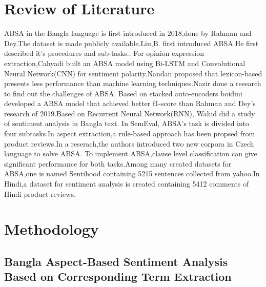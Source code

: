 \documentclass[a4paper,12pt]{article}
\begin{document}
\section{Review of Literature}
ABSA in the Bangla language is first introduced in 2018,done by Rahman and Dey\cite{rahman2018datasets}.The dataset is made publicly available.Liu,B. first introduced ABSA.He first described it's procedures and sub-tasks.\cite{liuABSA}.\newline
For opinion expression extraction,Cahyadi built an ABSA model using Bi-LSTM and Convolutional Neural Network(CNN) for sentiment polarity\cite{cahyadi2018aspect}.Nandan proposed that lexicon-based presents less performance than machine learning techniques\cite{nandal2019aspect}.Nazir done a research to find out the challenges of ABSA\cite{challenges}.\newline
Based on stacked auto-encoders boidini developed a ABSA model that achieved better f1-score than Rahman and Dey's research of 2019\cite{encoder}.Based on Recurrent Neural Network(RNN), Wahid did a study of sentiment analysis in Bangla text\cite{wahid2019cricket}.\newline
In SemEval, ABSA's task is divided into four subtasks\cite{semeval}.In aspect extraction,a rule-based approach has been propsed from product reviews\cite{rule-based}.In a reserach,the authors introduced two new corpora in Czech language to solve ABSA\cite{czech}.\newline
To implement ABSA,clause level classification can give significant performance for both tasks\cite{clauselevel}.Among many created datasets for ABSA,one is named Sentihood containing 5215 sentences collected from yahoo\cite{saeidi2016sentihood}.In Hindi,a dataset for sentiment analysis is created containing 5412 comments of Hindi product reviews\cite{hindi}.
\section{Methodology}
\subsection{Bangla Aspect-Based Sentiment  Analysis Based on Corresponding Term Extraction}
\end{document}

